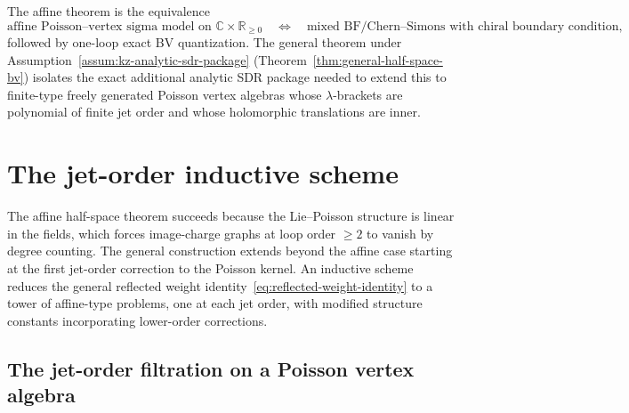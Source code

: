 \begin{summary}
The affine theorem is the equivalence
\[
\text{affine Poisson--vertex sigma model on } \mathbb C\times\mathbb R_{\ge 0}
\quad\Longleftrightarrow\quad
\text{mixed BF/Chern--Simons with chiral boundary condition},
\]
followed by one-loop exact BV quantization.
The general theorem under Assumption~\ref{assum:kz-analytic-sdr-package}
(Theorem~\ref{thm:general-half-space-bv}) isolates the exact additional
analytic SDR package needed to extend this to finite-type freely
generated Poisson vertex algebras whose $\lambda$-brackets are
polynomial of finite jet order and whose holomorphic translations are
inner.
\end{summary}

\section{The jet-order inductive scheme}
\label{sec:jet-order-inductive}

The affine half-space theorem succeeds because the Lie--Poisson structure
is linear in the fields, which forces image-charge graphs at loop order
$\ge 2$ to vanish by degree counting. The general construction extends beyond the affine case starting at
the first jet-order correction to the Poisson kernel. An inductive
scheme reduces the general reflected weight
identity~\eqref{eq:reflected-weight-identity} to a tower of affine-type
problems, one at each jet order, with modified structure constants
incorporating lower-order corrections.

\subsection{The jet-order filtration on a Poisson vertex algebra}

